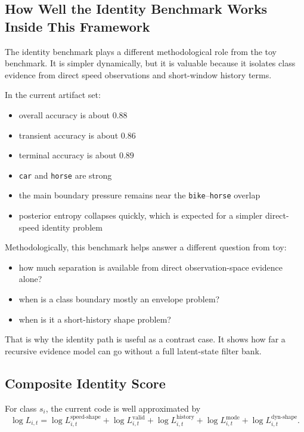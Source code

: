 \documentclass[11pt]{article}
\begin{document}
\subsection{How Well the Identity Benchmark Works Inside This Framework}

The identity benchmark plays a different methodological role from the toy
benchmark. It is simpler dynamically, but it is valuable because it isolates
class evidence from direct speed observations and short-window history terms.

In the current artifact set:
\begin{itemize}[leftmargin=1.5em]
    \item overall accuracy is about $0.88$
    \item transient accuracy is about $0.86$
    \item terminal accuracy is about $0.89$
    \item \texttt{car} and \texttt{horse} are strong
    \item the main boundary pressure remains near the
    \texttt{bike}--\texttt{horse} overlap
    \item posterior entropy collapses quickly, which is expected for a simpler
    direct-speed identity problem
\end{itemize}

Methodologically, this benchmark helps answer a different question from toy:
\begin{itemize}[leftmargin=1.5em]
    \item how much separation is available from direct observation-space
    evidence alone?
    \item when is a class boundary mostly an envelope problem?
    \item when is it a short-history shape problem?
\end{itemize}

That is why the identity path is useful as a contrast case. It shows how far a
recursive evidence model can go without a full latent-state filter bank.

\subsection{Composite Identity Score}

For class $s_i$, the current code is well approximated by
\begin{equation}
    \log L_{i,t}
    =
    \log L^{\text{speed-shape}}_{i,t}
    + \log L^{\text{valid}}_{i,t}
    + \log L^{\text{history}}_{i,t}
    + \log L^{\text{mode}}_{i,t}
    + \log L^{\text{dyn-shape}}_{i,t}.
\end{equation}
\end{document}
